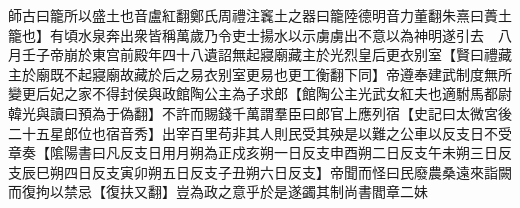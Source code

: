 師古曰籠所以盛土也音盧紅翻鄭氏周禮注竁土之器曰籠陸德明音力董翻朱熹曰蕢土籠也】有頃水泉奔出衆皆稱萬歲乃令吏士揚水以示虜虜出不意以為神明遂引去　八月壬子帝崩於東宫前殿年四十八遺詔無起寢廟藏主於光烈皇后更衣别室【賢曰禮藏主於廟既不起寢廟故藏於后之易衣别室更易也更工衡翻下同】帝遵奉建武制度無所變更后妃之家不得封侯與政館陶公主為子求郎【館陶公主光武女紅夫也適駙馬都尉韓光與讀曰預為于偽翻】不許而賜錢千萬謂羣臣曰郎官上應列宿【史記曰太微宮後二十五星郎位也宿音秀】出宰百里苟非其人則民受其殃是以難之公車以反支日不受章奏【隂陽書曰凡反支日用月朔為正戍亥朔一日反支申酉朔二日反支午未朔三日反支辰巳朔四日反支寅卯朔五日反支子丑朔六日反支】帝聞而怪曰民廢農桑遠來詣闕而復拘以禁忌【復扶又翻】豈為政之意乎於是遂蠲其制尚書閻章二妹